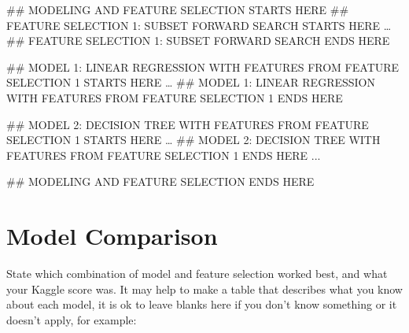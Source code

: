 \documentclass[11pt,]{article}
\newenvironment{Shaded}{\begin{snugshade}}{\end{snugshade}}
\newcommand{\RegionMarkerTok}[1]{#1}
\newcommand{\NormalTok}[1]{#1}
\begin{document}
\begin{Shaded}
\begin{Highlighting}[]
\NormalTok{## MODELING AND FEATURE SELECTION STARTS HERE}
\NormalTok{## FEATURE SELECTION 1: SUBSET FORWARD SEARCH STARTS HERE}
\NormalTok{…}
\NormalTok{## FEATURE SELECTION 1: SUBSET FORWARD SEARCH }\RegionMarkerTok{END}\NormalTok{S HERE}

\NormalTok{## MODEL 1: LINEAR REGRESSION WITH FEATURES FROM FEATURE SELECTION 1 STARTS HERE}
\NormalTok{…}
\NormalTok{## MODEL 1: LINEAR REGRESSION WITH FEATURES FROM FEATURE SELECTION 1 }\RegionMarkerTok{END}\NormalTok{S HERE}

\NormalTok{## MODEL 2: DECISION TREE WITH FEATURES FROM FEATURE SELECTION 1 STARTS HERE}
\NormalTok{…}
\NormalTok{## MODEL 2: DECISION TREE WITH FEATURES FROM FEATURE SELECTION 1 }\RegionMarkerTok{END}\NormalTok{S HERE}
\NormalTok{...}

\NormalTok{## MODELING AND FEATURE SELECTION }\RegionMarkerTok{END}\NormalTok{S HERE}
\end{Highlighting}
\end{Shaded}

\section{Model Comparison}\label{model-comparison}

State which combination of model and feature selection worked best, and
what your Kaggle score was. It may help to make a table that describes
what you know about each model, it is ok to leave blanks here if you
don't know something or it doesn't apply, for example:
\end{document}
